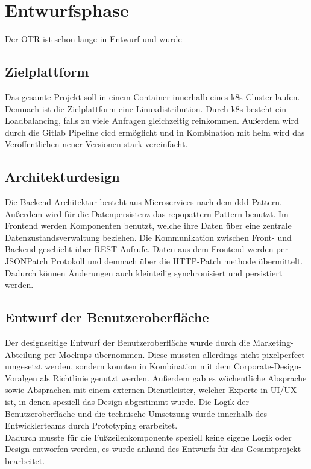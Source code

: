 \newpage
\section{Entwurfsphase}
\label{entwurfsphase}
Der \ac{OTR} ist schon lange in Entwurf und wurde 
\subsection{Zielplattform}
\label{zielplattform}
Das gesamte Projekt soll in einem \gls{Container} innerhalb eines \gls{k8s} Cluster laufen. Demnach ist die Zielplattform eine Linuxdistribution. Durch \gls{k8s} besteht ein Loadbalancing, falls zu viele Anfragen gleichzeitig reinkommen. Außerdem wird durch die Gitlab Pipeline \ac{cicd} ermöglicht und in Kombination mit \gls{helm} wird das Veröffentlichen neuer Versionen stark vereinfacht.
\subsection{Architekturdesign}
\label{architekturdesign}
Die Backend Architektur besteht aus Microservices nach dem \gls{ddd}-Pattern. Außerdem wird für die Datenpersistenz das \gls{repopattern}-Pattern benutzt. Im Frontend werden Komponenten benutzt, welche ihre Daten über eine zentrale Datenzustandsverwaltung beziehen. Die Kommunikation zwischen Front- und Backend geschieht über \gls{REST}-Aufrufe. Daten aus dem Frontend werden per JSONPatch Protokoll und demnach über die HTTP-Patch methode übermittelt. Dadurch können Änderungen auch kleinteilig synchronisiert und persistiert werden.
\subsection{Entwurf der Benutzeroberfläche}
\label{benutzeroberfläche}
Der designseitige Entwurf der Benutzeroberfläche wurde durch die Marketing-Abteilung per Mockups übernommen. Diese mussten allerdings nicht pixelperfect umgesetzt werden, sondern konnten in Kombination mit dem Corporate-Design-Voralgen als Richtlinie genutzt werden. Außerdem gab es wöchentliche Absprache sowie Absprachen mit einem externen Dienstleister, welcher Experte in UI/UX ist, in denen speziell das Design abgestimmt wurde. Die Logik der Benutzeroberfläche und die technische Umsetzung wurde innerhalb des Entwicklerteams durch Prototyping erarbeitet.\\
Dadurch musste für die Fußzeilenkomponente speziell keine eigene Logik oder Design entworfen werden, es wurde anhand des Entwurfs für das Gesamtprojekt bearbeitet.
